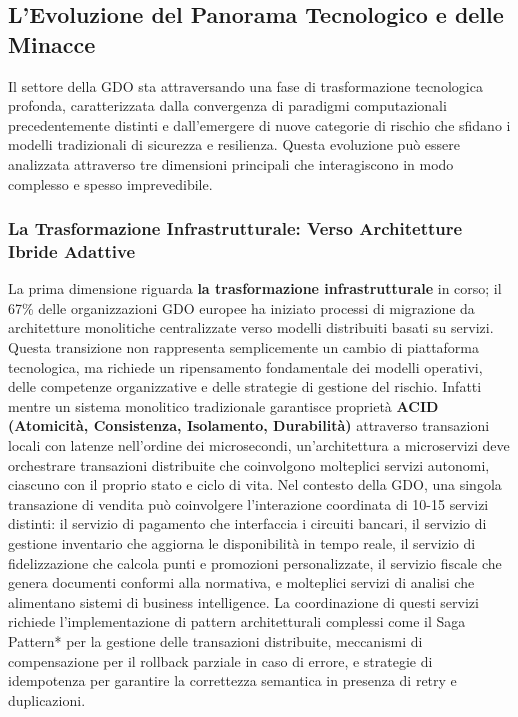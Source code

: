 \subsection{L'Evoluzione del Panorama Tecnologico e delle Minacce}

Il settore della GDO sta attraversando una fase di trasformazione tecnologica profonda, caratterizzata dalla convergenza di paradigmi computazionali precedentemente distinti e dall'emergere di nuove categorie di rischio che sfidano i modelli tradizionali di sicurezza e resilienza. Questa evoluzione può essere analizzata attraverso tre dimensioni principali che interagiscono in modo complesso e spesso imprevedibile.

\subsubsection{La Trasformazione Infrastrutturale: Verso Architetture Ibride Adattive}

La prima dimensione riguarda\textbf{ la trasformazione infrastrutturale} in corso; il 67\% delle organizzazioni GDO europee ha iniziato processi di migrazione da architetture monolitiche centralizzate verso modelli distribuiti basati su servizi\autocite{gartner2024cloud}. Questa transizione non rappresenta semplicemente un cambio di piattaforma tecnologica, ma richiede un ripensamento fondamentale dei modelli operativi, delle competenze organizzative e delle strategie di gestione del rischio. Infatti mentre un sistema monolitico tradizionale garantisce proprietà \textbf{ACID (Atomicità, Consistenza, Isolamento, Durabilità)} attraverso transazioni locali con latenze nell'ordine dei microsecondi, un'architettura a microservizi deve orchestrare transazioni distribuite che coinvolgono molteplici servizi autonomi, ciascuno con il proprio stato e ciclo di vita. 
Nel contesto della GDO, una singola transazione di vendita può coinvolgere l'interazione coordinata di 10-15 servizi distinti: il servizio di pagamento che interfaccia i circuiti bancari, il servizio di gestione inventario che aggiorna le disponibilità in tempo reale, il servizio di fidelizzazione che calcola punti e promozioni personalizzate, il servizio fiscale che genera documenti conformi alla normativa, e molteplici servizi di analisi che alimentano sistemi di business intelligence. La coordinazione di questi servizi richiede l'implementazione di pattern architetturali complessi come il Saga Pattern* per la gestione delle transazioni distribuite, meccanismi di compensazione per il rollback parziale in caso di errore, e strategie di idempotenza per garantire la correttezza semantica in presenza di retry e duplicazioni.

